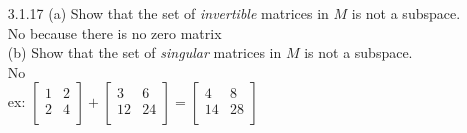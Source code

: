 \documentclass[10pt,twoside,reqno]{article}
\begin{document}
\begin{enumerate}
{yes\\
\vspace{3mm}

(e) All vectors that satisfy $b_1 + b_2 + b_3 = O$. \\ \vspace{1mm}
\vspace{3mm}

yes\\
\vspace{3mm}
(f) All vectors with $b_1 < b_2 < b_3$.  \\
\vspace{3mm}


no\\
\vspace{3mm}

}

\item[3.1.17] \hspace{5mm}(a) Show that the set of \textit{invertible} matrices in $M$ is not a subspace. \\ \vspace{1mm}
\vspace{3mm}
No because there is no zero matrix\\
\vspace{3mm}
\hspace{5mm}(b) Show that the set of \textit{singular} matrices in $M$ is not a subspace.\\
\vspace{3mm}
No\\
ex:
$
$$
\begin{bmatrix}
1&2\\
2&4\\
\end{bmatrix}
+
\begin{bmatrix}
3&6\\
12&24\\
\end{bmatrix}
=
\begin{bmatrix}
4&8\\
14&28\\
\end{bmatrix}
$$
$



\end{enumerate}
\end{document}

